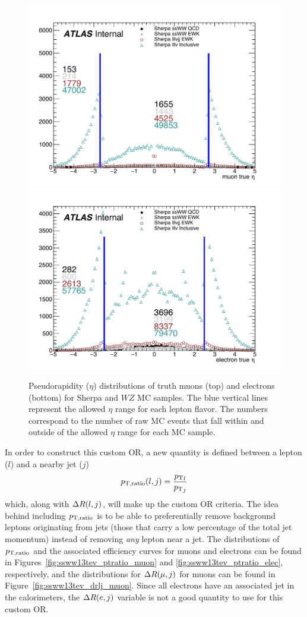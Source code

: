 \begin{figure}[htbp]
  \centering
  \includegraphics[width=.48\textwidth]{figs/ssww_13tev/custom_or/ExtraMuonEta_counted}
  \includegraphics[width=.48\textwidth]{figs/ssww_13tev/custom_or/ExtraElecEta_counted}
  \caption{Pseudorapidity ($\eta$) distributions of truth muons (top) and electrons (bottom) for Sherpa \ssww and $WZ$ MC samples.  The blue vertical lines represent the allowed $\eta$ range for each lepton flavor.  The numbers correspond to the number of raw MC events that fall within and outside of the allowed $\eta$ range for each MC sample.}
  \label{fig:ssww13tev_wzveto_truthlepeta}
\end{figure}

In order to construct this custom OR, a new quantity is defined between a lepton ($l$) and a nearby jet ($j$)
\begin{equation}
  \ptratio(l,j) = \frac{{\pt}_l}{{\pt}_j}%
  \label{eq:ssww13tev_ptratio}
\end{equation}
which, along with $\Delta R(l,j)$, will make up the custom OR criteria.
The idea behind including $p_{\textrm{T},\textrm{ratio}}$ is to be able to preferentially remove background leptons originating from jets (those that carry a low percentage of the total jet momentum) instead of removing \emph{any} lepton near a jet.
The distributions of $p_{\textrm{T},\textrm{ratio}}$ and the associated efficiency curves for muons and electrons can be found in Figures~\ref{fig:ssww13tev_ptratio_muon} and \ref{fig:ssww13tev_ptratio_elec}, respectively, and the distributions for $\Delta R(\mu,j)$ for muons can be found in Figure~\ref{fig:ssww13tev_drlj_muon}.
Since all electrons have an associated jet in the calorimeters, the $\Delta R(e,j)$ variable is not a good quantity to use for this custom OR.

